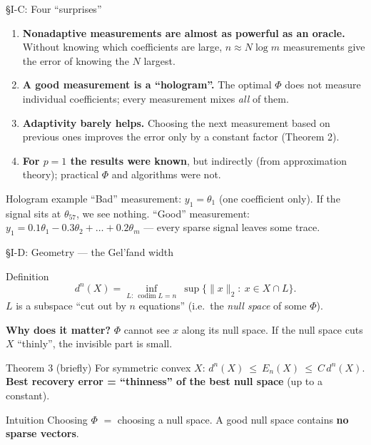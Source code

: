 \documentclass[aspectratio=169,11pt]{beamer}
\newcommand{\en}[1]{\textit{#1}}          %
\newcommand{\norm}[1]{\lVert #1\rVert}
\begin{document}
\begin{frame}{\S I-C: Four ``surprises''}
  \begin{enumerate}
    \item \textbf{Nonadaptive measurements are almost as powerful as an oracle.}
      Without knowing which coefficients are large, $n\approx N\log m$ measurements give the error of knowing the $N$ largest.
    \item \textbf{A good measurement is a ``hologram''.}
      The optimal $\Phi$ does not measure individual coefficients; every measurement mixes \emph{all} of them.
    \item \textbf{Adaptivity barely helps.}
      Choosing the next measurement based on previous ones improves the error only by a constant factor (Theorem 2).
    \item \textbf{For $p=1$ the results were known}, but indirectly (from approximation theory); practical $\Phi$ and algorithms were not.
  \end{enumerate}
  \begin{exampleblock}{Hologram example}
    ``Bad'' measurement: $y_1=\theta_1$ (one coefficient only). If the signal sits at $\theta_{57}$, we see nothing.
    ``Good'' measurement: $y_1=0.1\theta_1-0.3\theta_2+\dots+0.2\theta_m$ --- every sparse signal leaves some trace.
  \end{exampleblock}
\end{frame}

\begin{frame}{\S I-D: Geometry --- the Gel'fand width}
  \begin{block}{Definition}
    \[ d^n(X)=\inf_{L:\ \operatorname{codim}L=n}\ \sup\{\norm{x}_2:\ x\in X\cap L\}. \]
    $L$ is a subspace ``cut out by $n$ equations'' (i.e.\ the \en{null space} of some $\Phi$).
  \end{block}
  \textbf{Why does it matter?} $\Phi$ cannot see $x$ along its null space. If the null space cuts $X$ ``thinly'', the invisible part is small.
  \begin{block}{Theorem 3 (briefly)}
    For symmetric convex $X$: \quad $d^n(X)\ \le\ E_n(X)\ \le\ C\,d^n(X)$.
    \textbf{Best recovery error = ``thinness'' of the best null space} (up to a constant).
  \end{block}
  \begin{alertblock}{Intuition}
    Choosing $\Phi$ $=$ choosing a null space. A good null space contains \textbf{no sparse vectors}.
  \end{alertblock}
\end{frame}
\end{document}
